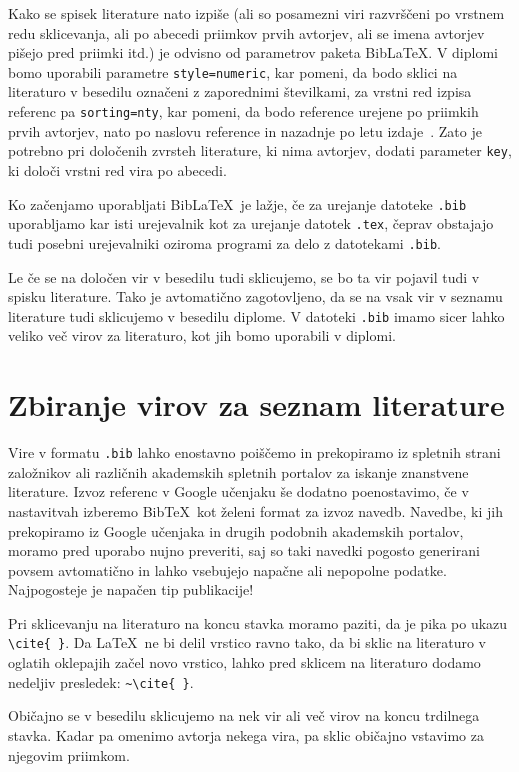 \documentclass[a4paper,12pt,openright]{book}
\newcommand{\BibLaTeX}{{\sc Bib}\LaTeX}
\newcommand{\BibTeX}{{\sc Bib}\TeX}
\begin{document}
Kako se spisek literature nato izpiše (ali so posamezni viri razvrščeni po vrstnem redu sklicevanja, ali po abecedi priimkov prvih avtorjev, ali se imena avtorjev pišejo pred priimki itd.) je odvisno od parametrov paketa \BibLaTeX.
V diplomi bomo uporabili parametre 
\texttt{style=numeric}, kar pomeni, da bodo sklici na literaturo v besedilu označeni z zaporednimi številkami, za vrstni red izpisa referenc pa 
\texttt{sorting=nty}, kar pomeni, da bodo reference urejene po priimkih prvih avtorjev, nato po naslovu reference in nazadnje po letu izdaje~\cite{ctan}.
Zato je potrebno pri določenih zvrsteh literature, ki nima avtorjev, dodati parameter \texttt{key}, ki določi vrstni red vira po abecedi.

Ko začenjamo uporabljati \BibLaTeX\ je lažje, če za urejanje datoteke \texttt{.bib} uporabljamo kar isti urejevalnik kot za urejanje datotek \texttt{.tex}, 
čeprav obstajajo tudi posebni urejevalniki oziroma programi za delo z datotekami \texttt{.bib}.

Le če se  na določen vir v besedilu tudi sklicujemo, se bo ta vir pojavil tudi v spisku literature.
Tako je avtomatično zagotovljeno, da se na vsak vir v seznamu literature tudi sklicujemo v besedilu diplome.
V datoteki \texttt{.bib} imamo sicer lahko veliko več virov za literaturo, kot jih bomo uporabili v diplomi.


\section{Zbiranje virov za seznam literature}

Vire v formatu \texttt{.bib}  lahko enostavno poiščemo in prekopiramo iz spletnih strani založnikov ali različnih akademskih spletnih portalov za iskanje znanstvene literature.
Izvoz  referenc v Google učenjaku še dodatno poenostavimo, če v nastavitvah izberemo \BibTeX\ kot želeni format za izvoz navedb.
Navedbe, ki jih  prekopiramo iz Google učenjaka in drugih podobnih akademskih portalov, moramo pred uporabo nujno preveriti, saj so taki navedki pogosto generirani povsem avtomatično in lahko vsebujejo napačne ali nepopolne podatke.
Najpogosteje je napačen tip publikacije!

Pri sklicevanju na literaturo na koncu stavka moramo paziti, da je pika po ukazu \verb=\cite{ }=.
Da \LaTeX\ ne bi delil vrstico ravno tako, da bi sklic na literaturo v oglatih oklepajih začel novo vrstico, lahko pred sklicem na literaturo dodamo nedeljiv presledek: \verb=~\cite{ }=.

Običajno se v besedilu sklicujemo  na nek vir ali več virov na koncu trdilnega stavka. 
Kadar pa omenimo avtorja nekega vira, pa sklic običajno vstavimo za njegovim priimkom.
\end{document}
